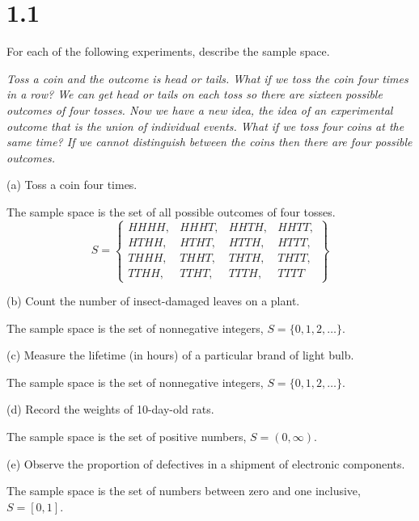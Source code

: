 \section*{1.1}
For each of the following experiments, describe the sample space.

\bigskip
\noindent
{\it Toss a coin and the outcome is head or tails.
What if we toss the coin four times in a row?
We can get head or tails on each toss so there are sixteen possible outcomes
of four tosses.
Now we have a new idea, the idea of an experimental outcome
that is the union of individual events.
What if we toss four coins at the same time?
If we cannot distinguish between the coins then there are four
possible outcomes.
}

\bigskip
\noindent
(a) Toss a coin four times.

\bigskip
The sample space is the set of all possible outcomes of four tosses.
\[
S=\left\{\begin{array}{llll}
HHHH, &HHHT, &HHTH, &HHTT,\\
HTHH, &HTHT, &HTTH, &HTTT,\\
THHH, &THHT, &THTH, &THTT,\\
TTHH, &TTHT, &TTTH, &TTTT
\end{array}\right\}
\]

\bigskip
\noindent
(b) Count the number of insect-damaged leaves on a plant.

\bigskip
The sample space is the set of nonnegative integers, $S=\{0,1,2,\ldots\}$.

\bigskip
\noindent
(c) Measure the lifetime (in hours) of a particular brand of light bulb.

\bigskip
The sample space is the set of nonnegative integers, $S=\{0,1,2,\ldots\}$.

\bigskip
\noindent
(d) Record the weights of 10-day-old rats.

\bigskip
The sample space is the set of positive numbers, $S=(0,\infty)$.

\bigskip
\noindent
(e) Observe the proportion of defectives in a shipment of electronic
components.

\bigskip
The sample space is the set of
numbers between zero and one inclusive,
$S=[0,1]$.


